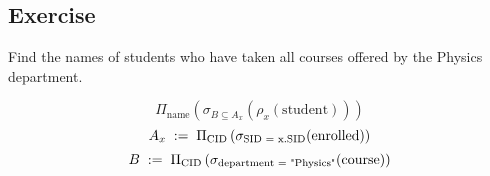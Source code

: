 \documentclass{article}
\begin{document}
\vspace{4mm}
\subsection{Exercise}
\noindent Find the names of students who have taken all courses offered by
the Physics department.

$$ \Pi_{\text{name}}\left(
    \sigma_{B \subseteq A_x}(
        \rho_x(\text{student}))
\right)$$
$$ A_x \hspace{1mm} := \hspace{1mm}
\Pi_{\text{CID}}\left(
    \sigma_{\text{SID = x.SID}}(
        \text{enrolled})
\right)$$
$$ B \hspace{1mm} := \hspace{1mm}
\Pi_{\text{CID}}\left(
    \sigma_{\text{department = "Physics"}}(
        \text{course})
\right)$$
\end{document}
